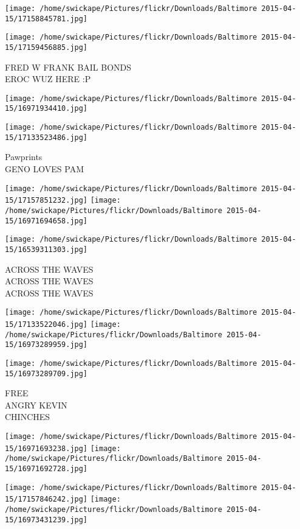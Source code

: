 \documentclass[10pt,letterpaper]{article}
\begin{document}
\texttt{[image: /home/swickape/Pictures/flickr/Downloads/Baltimore 2015-04-15/17158845781.jpg]}

\vspace{0.25in}
\texttt{[image: /home/swickape/Pictures/flickr/Downloads/Baltimore 2015-04-15/17159456885.jpg]}

FRED W FRANK BAIL BONDS\\
EROC WUZ HERE :P
\pagebreak

\texttt{[image: /home/swickape/Pictures/flickr/Downloads/Baltimore 2015-04-15/16971934410.jpg]}

\vspace{0.25in}
\texttt{[image: /home/swickape/Pictures/flickr/Downloads/Baltimore 2015-04-15/17133523486.jpg]}

Pawprints\\
GENO LOVES PAM
\pagebreak

\texttt{[image: /home/swickape/Pictures/flickr/Downloads/Baltimore 2015-04-15/17157851232.jpg]}
\texttt{[image: /home/swickape/Pictures/flickr/Downloads/Baltimore 2015-04-15/16971694658.jpg]}

\vspace{0.25in}
\texttt{[image: /home/swickape/Pictures/flickr/Downloads/Baltimore 2015-04-15/16539311303.jpg]}

ACROSS THE WAVES\\
ACROSS THE WAVES\\
ACROSS THE WAVES
\pagebreak

\texttt{[image: /home/swickape/Pictures/flickr/Downloads/Baltimore 2015-04-15/17133522046.jpg]}
\texttt{[image: /home/swickape/Pictures/flickr/Downloads/Baltimore 2015-04-15/16973289959.jpg]}

\vspace{0.25in}
\texttt{[image: /home/swickape/Pictures/flickr/Downloads/Baltimore 2015-04-15/16973289709.jpg]}

FREE\\
ANGRY KEVIN\\
CHINCHES
\pagebreak

\texttt{[image: /home/swickape/Pictures/flickr/Downloads/Baltimore 2015-04-15/16971693238.jpg]}
\texttt{[image: /home/swickape/Pictures/flickr/Downloads/Baltimore 2015-04-15/16971692728.jpg]}

\texttt{[image: /home/swickape/Pictures/flickr/Downloads/Baltimore 2015-04-15/17157846242.jpg]}
\texttt{[image: /home/swickape/Pictures/flickr/Downloads/Baltimore 2015-04-15/16973431239.jpg]}
\end{document}
